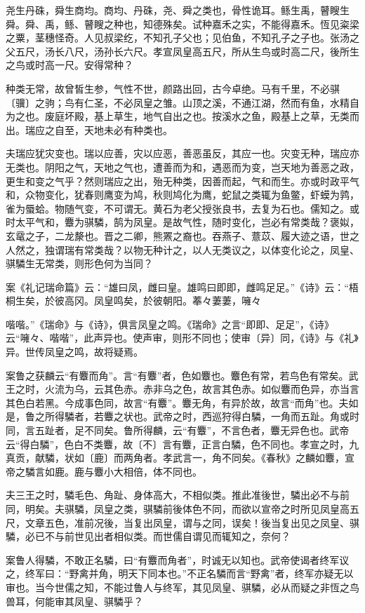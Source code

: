 \documentclass[]{article}
\begin{document}
尧生丹硃，舜生商均。商均、丹硃，尧、舜之类也，骨性诡耳。鲧生禹，瞽瞍生舜。舜、禹，鲧、瞽瞍之种也，知德殊矣。试种嘉禾之实，不能得嘉禾。恆见粢梁之粟，茎穗怪奇。人见叔梁纥，不知孔子父也；见伯鱼，不知孔子之子也。张汤之父五尺，汤长八尺，汤孙长六尺。孝宣凤皇高五尺，所从生鸟或时高二尺，後所生之鸟或时高一尺。安得常种？

种类无常，故曾皙生参，气性不世，颜路出回，古今卓绝。马有千里，不必骐〔骥〕之驹；鸟有仁圣，不必凤皇之雏。山顶之溪，不通江湖，然而有鱼，水精自为之也。废庭坏殿，基上草生，地气自出之也。按溪水之鱼，殿基上之草，无类而出。瑞应之自至，天地未必有种类也。

夫瑞应犹灾变也。瑞以应善，灾以应恶，善恶虽反，其应一也。灾变无种，瑞应亦无类也。阴阳之气，天地之气也，遭善而为和，遇恶而为变，岂天地为善恶之政，更生和变之气乎？然则瑞应之出，殆无种类，因善而起，气和而生。亦或时政平气和，众物变化，犹春则鹰变为鸠，秋则鸠化为鹰，蛇鼠之类辄为鱼鳖，虾蟆为鹑，雀为蜃蛤。物随气变，不可谓无。黄石为老父授张良书，去复为石也。儒知之。或时太平气和，麞为骐驎，鹄为凤皇。是故气性，随时变化，岂必有常类哉？褒姒，玄鼋之子，二龙漦也。晋之二卿，熊罴之裔也。吞燕子、薏苡、履大迹之语，世之人然之，独谓瑞有常类哉？以物无种计之，以人无类议之，以体变化论之，凤皇、骐驎生无常类，则形色何为当同？

案《礼记瑞命篇》云：``雄曰凤，雌曰皇。雄鸣曰即即，雌鸣足足。''《诗》云：``梧桐生矣，於彼高冈。凤皇鸣矣，於彼朝阳。菶々萋萋，噰々

喈喈。''《瑞命》与《诗》，俱言凤皇之鸣。《瑞命》之言``即即、足足''，《诗》云``噰々、喈喈''，此声异也。使声审，则形不同也；使审〔异〕同，《诗》与《礼》异。世传凤皇之鸣，故将疑焉。

案鲁之获麟云``有麞而角''。言``有麞''者，色如麞也。麞色有常，若鸟色有常矣。武王之时，火流为乌，云其色赤。赤非乌之色，故言其色赤。如似麞而色异，亦当言其色白若黑。今成事色同，故言``有麞''。麞无角，有异於故，故言``而角''也。夫如是，鲁之所得驎者，若麞之状也。武帝之时，西巡狩得白驎，一角而五趾。角或时同，言五趾者，足不同矣。鲁所得麟，云``有麞''，不言色者，麞无异色也。武帝云``得白驎''，色白不类麞，故〔不〕言有麞，正言白驎，色不同也。孝宣之时，九真贡，献驎，状如〔鹿〕而两角者。孝武言一，角不同矣。《春秋》之麟如麞，宣帝之驎言如鹿。鹿与麞小大相倍，体不同也。

夫三王之时，驎毛色、角趾、身体高大，不相似类。推此准後世，驎出必不与前同，明矣。夫骐驎，凤皇之类，骐驎前後体色不同，而欲以宣帝之时所见凤皇高五尺，文章五色，准前况後，当复出凤皇，谓与之同，误矣！後当复出见之凤皇、骐驎，必已不与前世见出者相似类。而世儒自谓见而辄知之，奈何？

案鲁人得驎，不敢正名驎，曰``有麞而角者''，时诚无以知也。武帝使谒者终军议之，终军曰：``野禽并角，明天下同本也。''不正名驎而言``野禽''者，终军亦疑无以审也。当今世儒之知，不能过鲁人与终军，其见凤皇、骐驎，必从而疑之非恆之鸟兽耳，何能审其凤皇、骐驎乎？
\end{document}
